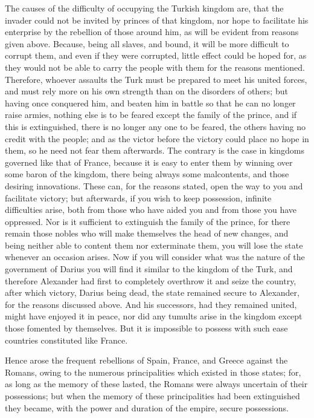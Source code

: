 \documentclass[12pt,letterpaper]{memoir}
\begin{document}
The causes of the difficulty of occupying the Turkish kingdom are, that
the invader could not be invited by princes of that kingdom, nor hope
to facilitate his enterprise by the rebellion of those around him, as
will be evident from reasons given above. Because, being all slaves,
and bound, it will be more difficult to corrupt them, and even if
they were corrupted, little effect could be hoped for, as they would
not be able to carry the people with them for the reasons mentioned.
Therefore, whoever assaults the Turk must be prepared to meet his
united forces, and must rely more on his own strength than on the
disorders of others; but having once conquered him, and beaten him in
battle so that he can no longer raise armies, nothing else is to be
feared except the family of the prince, and if this is extinguished,
there is no longer any one to be feared, the others having no credit
with the people; and as the victor before the victory could place no
hope in them, so he need not fear them afterwards. The contrary is
the case in kingdoms governed like that of France, because it is easy
to enter them by winning over some baron of the kingdom, there being
always some malcontents, and those desiring innovations. These can,
for the reasons stated, open the way to you and facilitate victory;
but afterwards, if you wish to keep possession, infinite difficulties
arise, both from those who have aided you and from those you have
oppressed. Nor is it sufficient to extinguish the family of the prince,
for there remain those nobles who will make themselves the head of new
changes, and being neither able to content them nor exterminate them,
you will lose the state whenever an occasion arises. Now if you will
consider what was the nature of the government of Darius you will find
it similar to the kingdom of the Turk, and therefore Alexander had
first to completely overthrow it and seize the country, after which
victory, Darius being dead, the state remained secure to Alexander,
for the reasons discussed above. And his successors, had they remained
united, might have enjoyed it in peace, nor did any tumults arise in
the kingdom except those fomented by themselves. But it is impossible
to possess with such ease countries constituted like France.

Hence arose the frequent rebellions of Spain, France, and Greece
against the Romans, owing to the numerous principalities which existed
in those states; for, as long as the memory of these lasted, the Romans
were always uncertain of their possessions; but when the memory of
these principalities had been extinguished they became, with the power
and duration of the empire, secure possessions.
\end{document}
